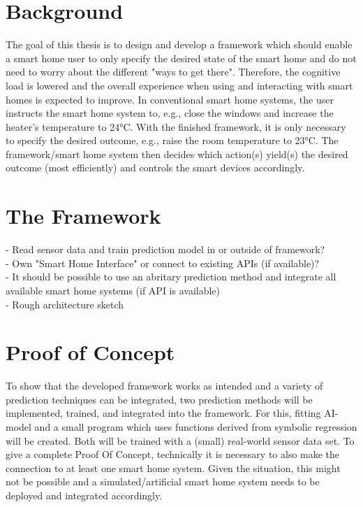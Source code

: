 \documentclass[a4paper,11pt]{article}
\begin{document}
\section{Background}
The goal of this thesis is to design and develop a framework which should enable a smart home user to only specify the desired state of the smart home and do not need to worry about the different "ways to get there".
Therefore, the cognitive load is lowered and the overall experience when using and interacting with smart homes is expected to improve.
In conventional smart home systems, the user instructs the smart home system to, e.g., close the windows and increase the heater's temperature to 24°C.
With the finished framework, it is only necessary to specify the desired outcome, e.g., raise the room temperature to 23°C.
The framework/smart home system then decides which action(s) yield(s) the desired outcome (most efficiently) and controls the smart devices accordingly.


\section{The Framework}
- Read sensor data and train prediction model in or outside of framework? \\
- Own "Smart Home Interface" or connect to existing APIs (if available)? \\
- It should be possible to use an abritary prediction method and integrate all available smart home systems (if API is available) \\
- Rough architecture sketch

\section{Proof of Concept}
To show that the developed framework works as intended and a variety of prediction techniques can be integrated, two prediction methods will be implemented, trained, and integrated into the framework.
For this, fitting AI-model and a small program which uses functions derived from symbolic regression will be created.
Both will be trained with a (small) real-world sensor data set.
To give a complete Proof Of Concept, technically it is necessary to also make the connection to at least one smart home system.
Given the situation, this might not be possible and a simulated/artificial smart home system needs to be deployed and integrated accordingly.
\end{document}
